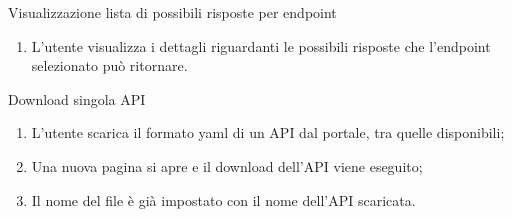 \begin{usecase}{6}{Visualizzazione lista di possibili risposte per endpoint}\label{uc:visualizzazione-risposte-endpoint}

    \usecasemain{}
        \begin{enumerate}
            \item L'utente visualizza i dettagli riguardanti le possibili risposte che l'endpoint selezionato può ritornare.
        \end{enumerate}

\end{usecase}


\begin{usecase}{7}{Download singola API}\label{uc:download-singola-api}

    \usecasemain{}
        \begin{enumerate}
            \item L'utente scarica il formato yaml di un API dal portale, tra quelle disponibili;
            \item Una nuova pagina si apre e il download dell'API viene eseguito;
            \item Il nome del file è già impostato con il nome dell'API scaricata.
        \end{enumerate}

\end{usecase}


